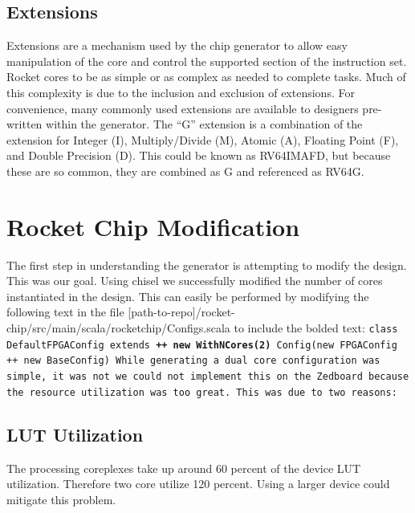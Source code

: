 \documentclass[journal]{IEEEtran}
\begin{document}
\subsection{Extensions}
Extensions are a mechanism used by the chip generator to allow easy manipulation of the core and control the supported section of the instruction set. Rocket cores to be as simple or as complex as needed to complete tasks. Much of this complexity is due to the inclusion and exclusion of extensions. For convenience, many commonly used extensions are available to designers pre-written within the generator. The ``G'' extension is a combination of the extension for Integer (I), Multiply/Divide (M), Atomic (A), Floating Point (F), and Double Precision (D). This could be known as RV64IMAFD, but because these are so common, they are combined as G and referenced as RV64G. 

\section{Rocket Chip Modification}
The first step in understanding the generator is attempting to modify the design. This was our goal. Using chisel we successfully modified the number of cores instantiated in the design. This can easily be performed by modifying the following text in the file [path-to-repo]/rocket-chip/src/main/scala/rocketchip/Configs.scala to include the bolded text:
\newline
\newline
\tt{class DefaultFPGAConfig extends \textbf{++ new WithNCores(2)} Config(new FPGAConfig ++ new BaseConfig)}\rm{}
\newline
\newline
While generating a dual core configuration was simple, it was not we could not implement this on the Zedboard because the resource utilization was too great. This was due to two reasons:
\subsection{LUT Utilization}
The processing coreplexes take up around 60 percent of the device LUT utilization. Therefore two core utilize 120 percent. Using a larger device could mitigate this problem.
\end{document}
